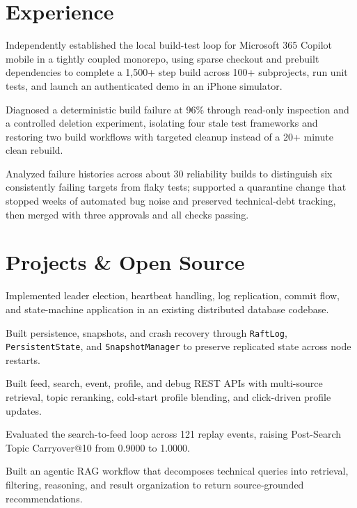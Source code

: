 \documentclass[letterpaper,10pt]{article}
\begin{document}
\section{Experience}
\resumeSubHeadingListStart
{}
\resumeItemListStart
  \item Independently established the local build-test loop for Microsoft 365 Copilot mobile in a tightly coupled monorepo, using sparse checkout and prebuilt dependencies to complete a 1,500+ step build across 100+ subprojects, run unit tests, and launch an authenticated demo in an iPhone simulator.
  \item Diagnosed a deterministic build failure at 96\% through read-only inspection and a controlled deletion experiment, isolating four stale test frameworks and restoring two build workflows with targeted cleanup instead of a 20+ minute clean rebuild.
  \item Analyzed failure histories across about 30 reliability builds to distinguish six consistently failing targets from flaky tests; supported a quarantine change that stopped weeks of automated bug noise and preserved technical-debt tracking, then merged with three approvals and all checks passing.
\resumeItemListEnd
\resumeSubHeadingListEnd

\section{Projects \& Open Source}
\resumeSubHeadingListStart
{}
\resumeItemListStart
  \item Implemented leader election, heartbeat handling, log replication, commit flow, and state-machine application in an existing distributed database codebase.
  \item Built persistence, snapshots, and crash recovery through \texttt{RaftLog}, \texttt{PersistentState}, and \texttt{SnapshotManager} to preserve replicated state across node restarts.
\resumeItemListEnd
{}
\resumeItemListStart
  \item Built feed, search, event, profile, and debug REST APIs with multi-source retrieval, topic reranking, cold-start profile blending, and click-driven profile updates.
  \item Evaluated the search-to-feed loop across 121 replay events, raising Post-Search Topic Carryover@10 from 0.9000 to 1.0000.
\resumeItemListEnd
{}
\resumeItemListStart
  \item Built an agentic RAG workflow that decomposes technical queries into retrieval, filtering, reasoning, and result organization to return source-grounded recommendations.
\resumeItemListEnd
\resumeSubHeadingListEnd
\end{document}
